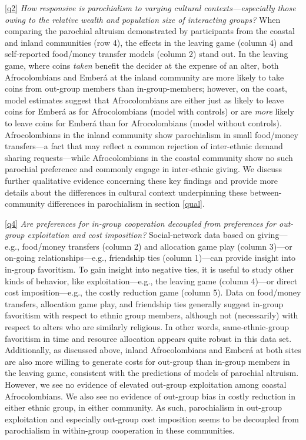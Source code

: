 \documentclass[bibauthoryear]{aa}
\begin{document}
\ref{q2} \emph{How responsive is parochialism to varying cultural contexts---especially those owing to the relative wealth and population size of interacting groups?} When comparing the parochial altruism demonstrated by participants from the coastal and inland communities (row 4), the effects in the leaving game (column 4) and self-reported food/money transfer models (column 2) stand out. In the leaving game, where coins \textit{taken} benefit the decider at the expense of an alter, both Afrocolombians and Ember\'a at the inland community are more likely to take coins from out-group members than in-group-members; however, on the coast, model estimates suggest that Afrocolombians are either just as likely to leave coins for Ember\'a  as for Afrocolombians (model with controls) or are \textit{more} likely to leave coins for Ember\'a than for Afrocolombians (model without controls).  Afrocolombians in the inland community show parochialism in small food/money transfers---a fact that may reflect a common \citep[although not universal,][]{Cay73} rejection of inter-ethnic demand sharing requests---while Afrocolombians in the coastal community show no such parochial preference and commonly engage in inter-ethnic giving. %
 We discuss further qualitative evidence concerning these key findings and provide more details about the differences in cultural context underpinning these between-community differences in parochialism in section \ref{qual}. 

\ref{q4} \emph{Are preferences for in-group cooperation decoupled from preferences for out-group exploitation and cost imposition?} Social-network data based on giving---e.g., food/money transfers (column 2) and allocation game play (column 3)---or  on-going relationships---e.g., friendship ties (column 1)---can provide insight into in-group favoritism. To gain insight into negative ties, it is useful to study other kinds of behavior, like exploitation---e.g., the leaving game (column 4)---or direct cost imposition---e.g., the costly reduction game (column 5). Data on food/money transfers, allocation game play, and friendship ties generally suggest in-group favoritism with respect to ethnic group members, although not (necessarily) with respect to alters who are similarly religious. %
In other words, same-ethnic-group favoritism in time and resource allocation appears quite robust in this data set. Additionally, as discussed above,  inland Afrocolombians and Ember\'a at both sites are also more willing to generate costs for out-group than in-group members in the leaving game, consistent with the predictions of models of parochial altruism.  However, we see no evidence of elevated out-group exploitation among coastal Afrocolombians. We also see no evidence of out-group bias in costly reduction in either ethnic group, in either community. As such, parochialism in out-group exploitation and especially out-group cost imposition seems to  be decoupled from parochialism in within-group cooperation in these communities.
\end{document}
